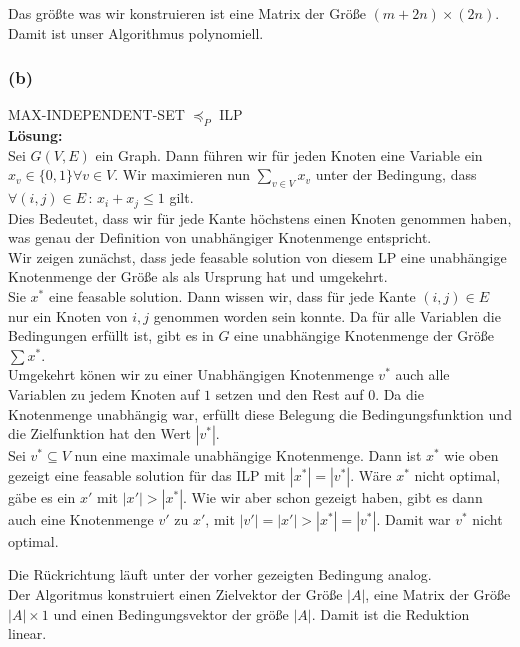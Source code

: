 \documentclass[11pt,a4paper,ngerman]{article}
\begin{document}
Das größte was wir konstruieren ist eine Matrix der Größe $(m+2n)\times(2n)$. Damit ist unser Algorithmus polynomiell.

\subsubsection*{(b)}
MAX-INDEPENDENT-SET $\preceq_P$ ILP\\

\textbf{Lösung:}\\

Sei $G(V,E)$ ein Graph. Dann führen wir für jeden Knoten eine Variable ein $x_v \in \{ 0 , 1 \} \forall v \in V$.
Wir maximieren nun $\underset{v \in V}{\sum} x_v$ unter der Bedingung,
dass $\forall (i,j) \in E \, : \, x_i + x_j \leq 1$ gilt.\\

Dies Bedeutet, dass wir für jede Kante höchstens einen Knoten genommen haben, was genau der Definition von
unabhängiger Knotenmenge entspricht.\\

Wir zeigen zunächst, dass jede feasable solution von diesem LP eine unabhängige Knotenmenge der Größe
als als Ursprung hat und umgekehrt.\\

Sie $x^*$ eine feasable solution. Dann wissen wir, dass für jede Kante $(i,j) \in E$ nur ein Knoten von $i,j$
genommen worden sein konnte. Da für alle Variablen die Bedingungen erfüllt ist, gibt es in $G$ eine unabhängige
Knotenmenge der Größe $\sum x^*$.\\
Umgekehrt könen wir zu einer Unabhängigen Knotenmenge $v^*$ auch alle Variablen zu jedem Knoten auf $1$ setzen und
den Rest auf $0$. Da die Knotenmenge unabhängig war, erfüllt diese Belegung die Bedingungsfunktion und die Zielfunktion
hat den Wert $|v^*|$.\\

Sei $v^* \subseteq V$ nun eine maximale unabhängige Knotenmenge.
Dann ist $x^*$ wie oben gezeigt eine feasable solution für das ILP mit $|x^*| = |v^*|$. Wäre $x^*$ nicht optimal,
gäbe es ein $x'$ mit $|x'| > |x^*|$. Wie wir aber schon gezeigt haben, gibt es dann auch eine Knotenmenge
$v'$ zu $x'$, mit $|v'| = |x'| > |x^*| = |v^*|$. Damit war $v^*$ nicht optimal.

Die Rückrichtung läuft unter der vorher gezeigten Bedingung analog.\\

Der Algoritmus konstruiert einen Zielvektor der Größe $|A|$, eine Matrix der Größe $|A|\times1$ und einen Bedingungsvektor
der größe $|A|$. Damit ist die Reduktion linear.
\end{document}
